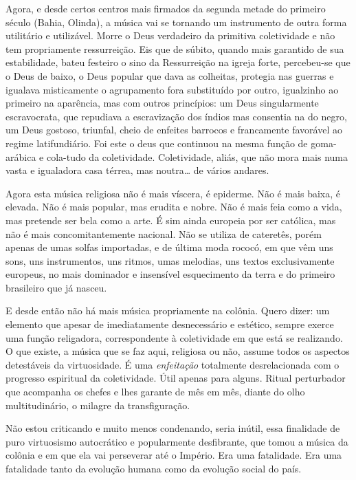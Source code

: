 Agora, e desde certos centros mais firmados da segunda metade do
primeiro século (Bahia, Olinda), a música vai se tornando um instrumento
de outra forma utilitário e utilizável. Morre o Deus verdadeiro da
primitiva coletividade e não tem propriamente ressurreição. Eis que de
súbito, quando mais garantido de sua estabilidade, bateu festeiro o sino
da Ressurreição na igreja forte, percebeu-se que o Deus de baixo, o Deus
popular que dava as colheitas, protegia nas guerras e igualava
misticamente o agrupamento fora substituído por outro, igualzinho ao
primeiro na aparência, mas com outros princípios: um Deus singularmente
escravocrata, que repudiava a escravização dos índios mas consentia na
do negro, um Deus gostoso, triunfal, cheio de enfeites barrocos e
francamente favorável ao regime latifundiário. Foi este o deus que
continuou na mesma função de goma-arábica e cola-tudo da coletividade.
Coletividade, aliás, que não mora mais numa vasta e igualadora casa
térrea, mas noutra\ldots{} de vários andares.

Agora esta música religiosa não é mais víscera, é epiderme. Não é mais
baixa, é elevada. Não é mais popular, mas erudita e nobre. Não é mais
feia como a vida, mas pretende ser bela como a arte. É sim ainda
europeia por ser católica, mas não é mais concomitantemente nacional.
Não se utiliza de cateretês, porém apenas de umas solfas importadas, e
de última moda rococó, em que vêm uns sons, uns instrumentos, uns
ritmos, umas melodias, uns textos exclusivamente europeus, no mais
dominador e insensível esquecimento da terra e do primeiro brasileiro
que já nasceu.

E desde então não há mais música propriamente na colônia. Quero dizer:
um elemento que apesar de imediatamente desnecessário e estético, sempre
exerce uma função religadora, correspondente à coletividade em que está
se realizando. O que existe, a música que se faz aqui, religiosa ou não,
assume todos os aspectos detestáveis da virtuosidade. É uma \textit{enfeitação}
totalmente desrelacionada com o progresso espiritual da coletividade.
Útil apenas para alguns. Ritual perturbador que acompanha os chefes e
lhes garante de mês em mês, diante do olho multitudinário, o milagre da
transfiguração.

Não estou criticando e muito menos condenando, seria inútil, essa
finalidade de puro virtuosismo autocrático e popularmente desfibrante,
que tomou a música da colônia e em que ela vai perseverar até o Império.
Era uma fatalidade. Era uma fatalidade tanto da evolução humana como da
evolução social do país.

